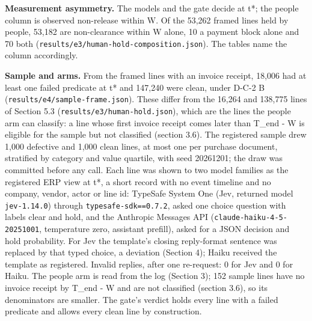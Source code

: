 \documentclass[
  10pt,
]{article}
\begin{document}
\textbf{Measurement asymmetry.} The models and the gate decide at t*;
the people column is observed non-release within W. Of the 53,262 framed
lines held by people, 53,182 are non-clearance within W alone, 10 a
payment block alone and 70 both
(\texttt{results/e3/human-hold-composition.json}). The tables name the
column accordingly.

\textbf{Sample and arms.} From the framed lines with an invoice receipt,
18,006 had at least one failed predicate at t* and 147,240 were clean,
under D-C-2 B (\texttt{results/e4/sample-frame.json}). These differ from
the 16,264 and 138,775 lines of Section 5.3
(\texttt{results/e3/human-hold.json}), which are the lines the people
arm can classify: a line whose first invoice receipt comes later than
T\_end - W is eligible for the sample but not classified (section 3.6).
The registered sample drew 1,000 defective and 1,000 clean lines, at
most one per purchase document, stratified by category and value
quartile, with seed 20261201; the draw was committed before any call.
Each line was shown to two model families as the registered ERP view at
t*, a short record with no event timeline and no company, vendor, actor
or line id: TypeSafe System One (Jev, returned model
\texttt{jev-1.14.0}) through \texttt{typesafe-sdk==0.7.2}, asked one
choice question with labels clear and hold, and the Anthropic Messages
API (\texttt{claude-haiku-4-5-20251001}, temperature zero, assistant
prefill), asked for a JSON decision and hold probability. For Jev the
template's closing reply-format sentence was replaced by that typed
choice, a deviation (Section 4); Haiku received the template as
registered. Invalid replies, after one re-request: 0 for Jev and 0 for
Haiku. The people arm is read from the log (Section 3); 152 sample lines
have no invoice receipt by T\_end - W and are not classified (section
3.6), so its denominators are smaller. The gate's verdict holds every
line with a failed predicate and allows every clean line by
construction.
\end{document}
